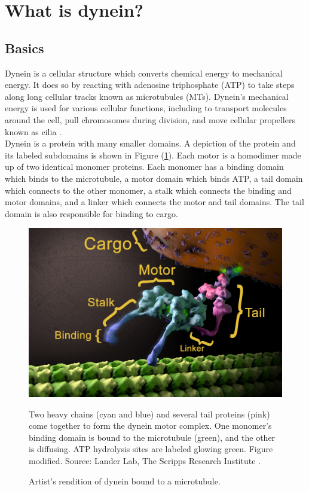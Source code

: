 \documentclass[
11pt, %
english, %
singlespacing, %
headsepline, %
chapterinoneline, %
]{MastersDoctoralThesis} %
\begin{document}


\section{What is dynein?}
\subsection{Basics}
Dynein is a cellular structure which converts chemical energy to mechanical energy. It does so by reacting with adenosine triphosphate (ATP) to take steps along long cellular tracks known as microtubules (MTs). Dynein's mechanical energy is used for various cellular functions, including to transport molecules around the cell, pull chromosomes during division, and move cellular propellers known as cilia \cite{cianfroccoreview}.\\

Dynein is a protein with many smaller domains. A depiction of the protein and its labeled subdomains is shown in Figure (\ref{dynein-artist-rendition}). Each motor is a homodimer made up of two identical monomer proteins. Each monomer has a binding domain which binds to the microtubule, a motor domain which binds ATP, a tail domain which connects to the other monomer, a stalk which connects the binding and motor domains, and a linker which connects the motor and tail domains. The tail domain is also responsible for binding to cargo.\\

\begin{figure}[h]
  \centering
  \includegraphics[width=.65\textwidth,keepaspectratio]{../../figures/dynein-artist-rendition.jpg}
  \caption{Artist's rendition of dynein bound to a microtubule.}{Two heavy chains (cyan and blue) and several tail proteins (pink) come together to form the dynein motor complex. One monomer's binding domain is bound to the microtubule (green), and the other is diffusing. ATP hydrolysis sites are labeled glowing green. Figure modified. Source: Lander Lab, The Scripps Research Institute \cite{landerartistsrendition}.}
  \label{dynein-artist-rendition}
\end{figure}
\end{document}
